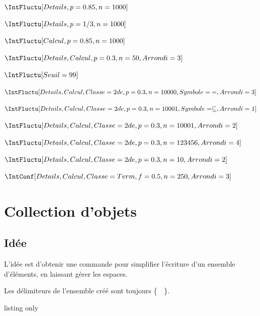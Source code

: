 \begin{PresCodeTexPL}{}
$\IntFluctu[Details,p=0.85,n=1000]$

$\IntFluctu[Details,p=1/3,n=1000]$

$\IntFluctu[Calcul,p=0.85,n=1000]$

$\IntFluctu[Details,Calcul,p=0.3,n=50,Arrondi=3]$

$\IntFluctu[Seuil=99]$

$\IntFluctu[Details,Calcul,Classe=2de,p=0.3,n=10000,Symbole={=},Arrondi=3]$

$\IntFluctu[Details,Calcul,Classe=2de,p=0.3,n=10001,Symbole=\subseteq,Arrondi=1]$

$\IntFluctu[Details,Calcul,Classe=2de,p=0.3,n=10001,Arrondi=2]$

$\IntFluctu[Details,Calcul,Classe=2de,p=0.3,n=123456,Arrondi=4]$

$\IntFluctu[Details,Calcul,Classe=2de,p=0.3,n=10,Arrondi=2]$

$\IntConf[Details,Calcul,Classe=Term,f=0.5,n=250,Arrondi=3]$
\end{PresCodeTexPL}

\begin{PresCodeTexPL}{}

\end{PresCodeTexPL}

\pagebreak

\section{Collection d'objets}\label{ensembles}

\subsection{Idée}

\begin{tipblock}
L'idée est d'obtenir une commande pour simplifier l'écriture d'un ensemble d'éléments, en laissant gérer les espaces.

Les délimiteurs de l'ensemble créé sont toujours \textsf{\{~~\}}.
\end{tipblock}

\begin{PresCodeTexPL}{listing only}
\end{PresCodeTexPL}


